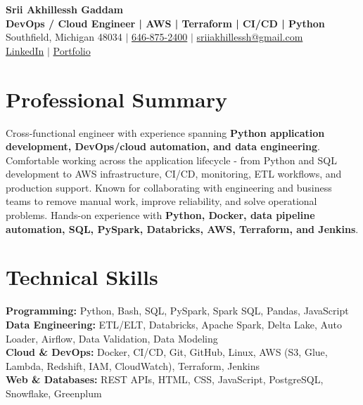 \documentclass[letterpaper,10pt]{article}
\begin{document}
\fontsize{9.35pt}{10.45pt}\selectfont

\begin{center}
    {\LARGE \textbf{Srii Akhillessh Gaddam}} \\[-1pt]
    \textbf{DevOps / Cloud Engineer | AWS | Terraform | CI/CD | Python} \\[2pt]
    Southfield, Michigan 48034 $|$
    \href{tel:6468752400}{646-875-2400} $|$
    \href{mailto:sriiakhillessh@gmail.com}{sriiakhillessh@gmail.com} \\[1pt]
    \href{https://www.linkedin.com/in/srii-akhiilessh-gaddam-b48668191/}{LinkedIn} $|$
    \href{https://sriiakhillesshg.github.io/portfolio/}{Portfolio}
\end{center}
\vspace{-8pt}

\section{Professional Summary}
\small{Cross-functional engineer with experience spanning \textbf{Python application development, DevOps/cloud automation, and data engineering}. Comfortable working across the application lifecycle - from Python and SQL development to AWS infrastructure, CI/CD, monitoring, ETL workflows, and production support. Known for collaborating with engineering and business teams to remove manual work, improve reliability, and solve operational problems. Hands-on experience with \textbf{Python, Docker, data pipeline automation, SQL, PySpark, Databricks, AWS, Terraform, and Jenkins}.}

\section{Technical Skills}
\small{
\textbf{Programming:} Python, Bash, SQL, PySpark, Spark SQL, Pandas, JavaScript \\
\textbf{Data Engineering:} ETL/ELT, Databricks, Apache Spark, Delta Lake, Auto Loader, Airflow, Data Validation, Data Modeling \\
\textbf{Cloud \& DevOps:} Docker, CI/CD, Git, GitHub, Linux, AWS (S3, Glue, Lambda, Redshift, IAM, CloudWatch), Terraform, Jenkins \\
\textbf{Web \& Databases:} REST APIs, HTML, CSS, JavaScript, PostgreSQL, Snowflake, Greenplum
}
\end{document}
